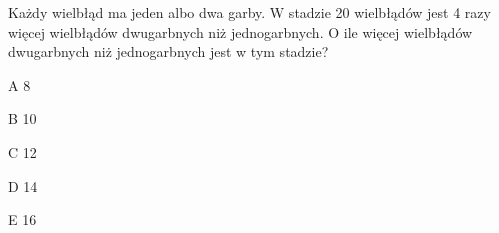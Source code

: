 \begin{tresc}
Każdy wielbłąd ma jeden albo dwa garby. W stadzie 20 wielbłądów jest 4 razy więcej wielbłądów dwugarbnych niż jednogarbnych. O ile więcej wielbłądów dwugarbnych niż jednogarbnych jest w tym stadzie?
\end{tresc}
\begin{wariant}{A} 8 \end{wariant}
\begin{wariant}{B} 10 \end{wariant}
\begin{wariant}{C} 12 \end{wariant}
\begin{wariant}{D} 14 \end{wariant}
\begin{wariant}{E} 16 \end{wariant}
